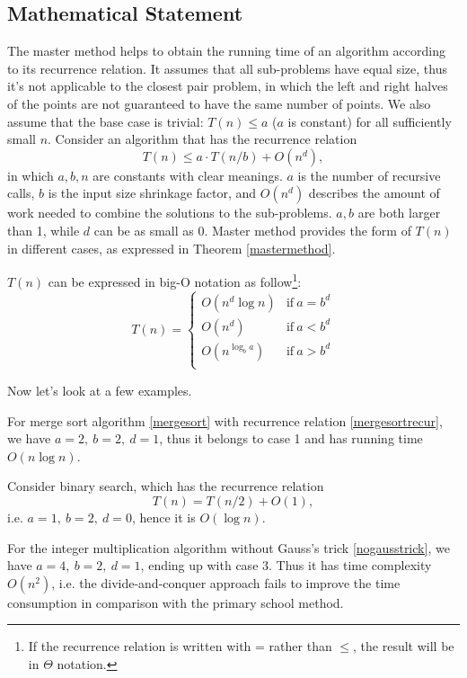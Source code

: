 \subsection{Mathematical Statement}
The master method helps to obtain the running time of an algorithm according to its recurrence relation. It assumes that all sub-problems have equal size, thus it's not applicable to the closest pair problem, in which the left and right halves of the points are not guaranteed to have the same number of points. We also assume that the base case is trivial: $T(n)\leq a$ ($a$ is constant) for all sufficiently small $n$. Consider an algorithm that has the recurrence relation
\begin{equation*}
T(n)\leq a\cdot T(n/b)+O(n^d),
\end{equation*}
in which $a,b,n$ are constants with clear meanings. $a$ is the number of recursive calls, $b$ is the input size shrinkage factor, and $O(n^d)$ describes the amount of work needed to combine the solutions to the sub-problems. $a,b$ are both larger than 1, while $d$ can be as small as 0. Master method provides the form of $T(n)$ in different cases, as expressed in Theorem \ref{mastermethod}.
\begin{theorem}\label{mastermethod}
$T(n)$ can be expressed in big-O notation as follow\footnote{If the recurrence relation is written with = rather than $\leq$, the result will be in $\Theta$ notation.}:
\begin{equation*}
T(n)=
\begin{cases}
O(n^d\log n)&\text{if}\:a=b^d\\
O(n^d)&\text{if}\:a<b^d\\
O(n^{\log_ba})&\text{if}\:a>b^d\\
\end{cases}
\end{equation*}
\end{theorem}
Now let's look at a few examples. 

For merge sort algorithm \ref{mergesort} with recurrence relation \eqref{mergesortrecur}, we have $a=2,\:b=2,\:d=1$, thus it belongs to case 1 and has running time $O(n\log n)$. 

Consider binary search, which has the recurrence relation
\begin{equation*}
T(n)=T(n/2)+O(1),
\end{equation*} 
i.e. $a=1,\:b=2,\:d=0$, hence it is $O(\log n)$. 

For the integer multiplication algorithm without Gauss's trick \eqref{nogausstrick}, we have $a=4,\:b=2,\:d=1$, ending up with case 3. Thus it has time complexity $O(n^2)$, i.e. the divide-and-conquer approach fails to improve the time consumption in comparison with the primary school method. 

